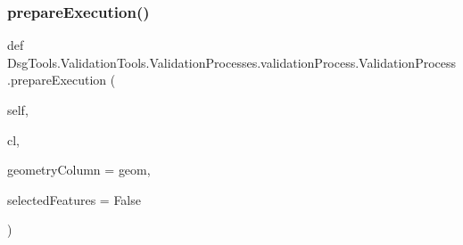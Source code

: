 \subsubsection{\texorpdfstring{prepare\+Execution()}{prepareExecution()}}
{\footnotesize\ttfamily def Dsg\+Tools.\+Validation\+Tools.\+Validation\+Processes.\+validation\+Process.\+Validation\+Process.\+prepare\+Execution (\begin{DoxyParamCaption}\item[{}]{self,  }\item[{}]{cl,  }\item[{}]{geometry\+Column = {\ttfamily \textquotesingle{}geom\textquotesingle{}},  }\item[{}]{selected\+Features = {\ttfamily False} }\end{DoxyParamCaption})}

